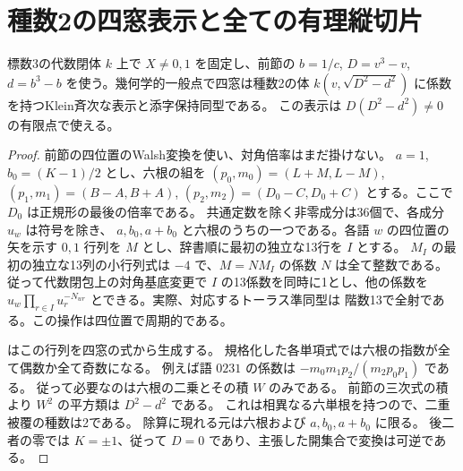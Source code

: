 \section{種数2の四窓表示と全ての有理縦切片}
\label{sec:rank-fifteen-genus-two-unit-line}

\begin{proposition}\label{prop:rank-fifteen-diagonal-genus-two}
標数3の代数閉体 $k$ 上で $X\ne0,1$ を固定し、前節の $b=1/c$, $D=v^3-v$,
$d=b^3-b$ を使う。幾何学的一般点で四窓は種数2の体
$k(v,\sqrt{D^2-d^2})$ に係数を持つKlein斉次な表示と添字保持同型である。
この表示は $D(D^2-d^2)\ne0$ の有限点で使える。
\end{proposition}
\begin{proof}
前節の四位置のWalsh変換を使い、対角倍率はまだ掛けない。
$a=1$, $b_0=(K-1)/2$ とし、六根の組を
$(p_0,m_0)=(L+M,L-M)$, $(p_1,m_1)=(B-A,B+A)$,
$(p_2,m_2)=(D_0-C,D_0+C)$ とする。ここで $D_0$ は正規形の最後の倍率である。
共通定数を除く非零成分は36個で、各成分 $u_w$ は符号を除き、
$a,b_0,a+b_0$ と六根のうちの一つである。各語 $w$ の四位置の矢を示す
$0,1$ 行列を $M$ とし、辞書順に最初の独立な13行を $I$ とする。
$M_I$ の最初の独立な13列の小行列式は $-4$ で、$M=N M_I$ の係数 $N$ は全て整数である。
従って代数閉包上の対角基底変更で $I$ の13係数を同時に1とし、他の係数を
$u_w\prod_{r\in I}u_r^{-N_{wr}}$ とできる。実際、対応するトーラス準同型は
階数13で全射である。この操作は四位置で周期的である。

 はこの行列を四窓の式から生成する。
規格化した各単項式では六根の指数が全て偶数か全て奇数になる。
例えば語 $0231$ の係数は $-m_0m_1p_2/(m_2p_0p_1)$ である。
従って必要なのは六根の二乗とその積 $W$ のみである。
前節の三次式の積より $W^2$ の平方類は $D^2-d^2$ である。
これは相異なる六単根を持つので、二重被覆の種数は2である。
除算に現れる元は六根および $a,b_0,a+b_0$ に限る。
後二者の零では $K=\pm1$、従って $D=0$ であり、主張した開集合で変換は可逆である。
\end{proof}

